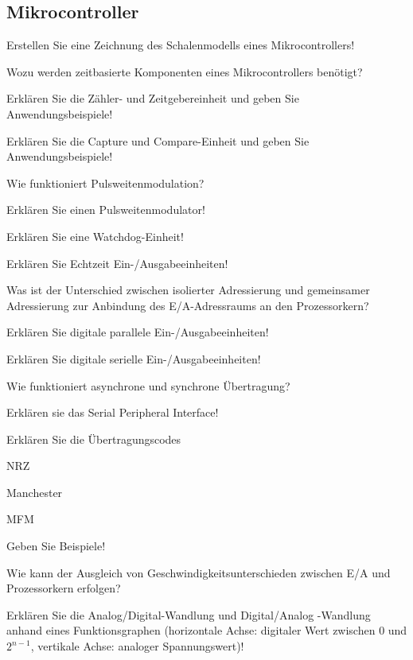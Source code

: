 \documentclass
[
  draft    = true,
  fontsize = 11pt,
  parskip  = half-,
  BCOR     = 0pt,
  DIV      = 11,
  ngerman,
  dvipsnames
]
{scrartcl}
\begin{document}
\subsection*{Mikrocontroller}
\begin{mytemize}
  \item Erstellen Sie eine Zeichnung des Schalenmodells eines Mikrocontrollers!
  \item Wozu werden zeitbasierte Komponenten eines Mikrocontrollers benötigt?
  \item Erklären Sie die Zähler- und Zeitgebereinheit und geben Sie Anwendungsbeispiele!
  \item Erklären Sie die \glqq{}Capture und Compare\grqq-Einheit und geben Sie Anwendungsbeispiele!
  \item Wie funktioniert Pulsweitenmodulation?
  \item Erklären Sie einen Pulsweitenmodulator!
  \item Erklären Sie eine Watchdog-Einheit!
  \item Erklären Sie Echtzeit Ein-/Ausgabeeinheiten!
  \item Was ist der Unterschied zwischen isolierter Adressierung und gemeinsamer Adressierung zur Anbindung des E/A-Adressraums an den Prozessorkern?
  \item Erklären Sie digitale parallele Ein-/Ausgabeeinheiten!
  \item Erklären Sie digitale serielle Ein-/Ausgabeeinheiten!
  \item Wie funktioniert asynchrone und synchrone Übertragung?
  \item Erklären sie das Serial Peripheral Interface!
  \item Erklären Sie die Übertragungscodes
        \begin{mytemize}
          \item NRZ
          \item Manchester
          \item MFM
          \item Geben Sie Beispiele!
        \end{mytemize}
  \item Wie kann der Ausgleich von Geschwindigkeitsunterschieden zwischen E/A und Prozessorkern erfolgen?
  \item Erklären Sie die Analog/Digital-Wandlung und Digital/Analog -Wandlung anhand eines Funktionsgraphen (horizontale Achse: digitaler Wert zwischen 0 und $2^{n-1}$, vertikale Achse: analoger Spannungswert)!

\end{mytemize}
\end{document}
